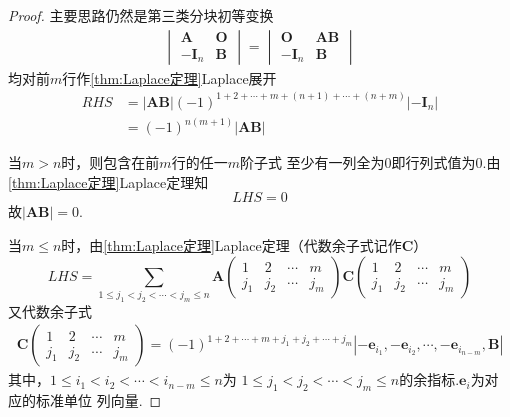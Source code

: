 {\begin{proof}
        主要思路仍然是第三类分块初等变换
        \begin{align*}
            \begin{vmatrix}
                \bm{A}    & \bm{O} \\
                -\bm{I}_n & \bm{B}
            \end{vmatrix}=\begin{vmatrix}
                              \bm{O}    & \bm{AB} \\
                              -\bm{I}_n & \bm{B}
                          \end{vmatrix}
        \end{align*}
        均对前$m$行作\cref{thm:Laplace定理}Laplace展开
        \begin{align*}
            RHS & =\left|\bm{AB}\right|\left(-1\right)^{
                1+2+\cdots+m+\left(n+1\right)+\cdots+\left(n+m\right)
            }\left|-\bm{I}_n\right|                                        \\
                & =\left(-1\right)^{n\left(m+1\right)}\left|\bm{AB}\right|
        \end{align*}

        当$m>n$时，则包含在前$m$行的任一$m$阶子式
        至少有一列全为0即行列式值为0.由\cref{thm:Laplace定理}Laplace定理知
        \[
            LHS = 0
        \]
        故$\left|\bm{AB}\right|=0$.

        当$m\leqslant n$时，由\cref{thm:Laplace定理}Laplace定理（代数余子式记作$\bm{C}$）
        \[
            LHS =\sum_{1\leqslant j_1<j_2<\cdots<j_m\leqslant n}\bm{A}\begin{pmatrix}
                1   & 2   & \cdots & m   \\
                j_1 & j_2 & \cdots & j_m
            \end{pmatrix}\bm{C}\begin{pmatrix}
                1   & 2   & \cdots & m   \\
                j_1 & j_2 & \cdots & j_m
            \end{pmatrix}
        \]
        又代数余子式
        \begin{align*}
            \bm{C}\begin{pmatrix}
                      1   & 2   & \cdots & m   \\
                      j_1 & j_2 & \cdots & j_m
                  \end{pmatrix}=\left(-1
            \right)^{1+2+\cdots+m+j_1
                +j_2+\cdots+j_m}\left|-\bm{e}_{i_1},-\bm{e}_{i_2},\cdots,-\bm{e}_{i_{n-m}},\bm{B}\right|
        \end{align*}
        其中，$1\leqslant i_1<i_2<\cdots<i_{n-m}\leqslant n$为
        $1\leqslant j_1<j_2<\cdots<j_m
            \leqslant n$的余指标.$
            \bm{e}_i$为对应的标准单位
        列向量.


\end{proof}}
